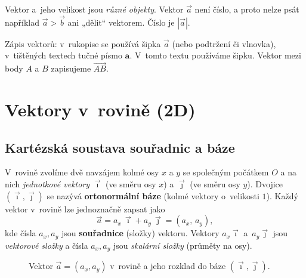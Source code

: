 \documentclass[a4paper,11pt]{article}
\newcommand{\abs}[1]{\left\lvert #1\right\rvert}
\newcommand{\ii}{\vec{\imath}}
\newcommand{\jj}{\vec{\jmath}}
\begin{document}
\begin{pozor}
Vektor a~jeho velikost jsou \emph{různé objekty}. Vektor $\vec a$ není číslo, a proto
nelze psát například $\vec a>\vec b$ ani „dělit“ vektorem. Číslo je $\abs{\vec a}$.
\end{pozor}

\begin{poznamka}
Zápis vektorů: v~rukopise se používá šipka $\vec a$ (nebo podtržení či vlnovka),
v~tištěných textech tučné písmo $\mathbf a$. V~tomto textu používáme šipku.
Vektor mezi body $A$ a $B$ zapisujeme $\overrightarrow{AB}$.
\end{poznamka}

\section{Vektory v~rovině (2D)}

\subsection{Kartézská soustava souřadnic a báze}

V~rovině zvolíme dvě navzájem kolmé osy $x$ a $y$ se společným počátkem $O$ a na
nich \emph{jednotkové vektory} $\ii$ (ve směru osy $x$) a $\jj$ (ve směru osy $y$).
Dvojice $(\ii,\jj)$ se nazývá \textbf{ortonormální báze} (kolmé vektory o~velikosti
$1$). Každý vektor v~rovině lze jednoznačně zapsat jako
\begin{equation}
  \vec a = a_x\,\ii + a_y\,\jj = (a_x,\,a_y),
\end{equation}
kde čísla $a_x,a_y$ jsou \textbf{souřadnice} (složky) vektoru. Vektory
$a_x\ii$ a~$a_y\jj$ jsou \emph{vektorové složky} a čísla $a_x,a_y$ jsou
\emph{skalární složky} (průměty na osy).

\begin{figure}[!htbp]
\centering
{}
\caption{Vektor $\vec a=(a_x,a_y)$ v~rovině a jeho rozklad do báze $(\ii,\jj)$.}
\end{figure}
\end{document}
